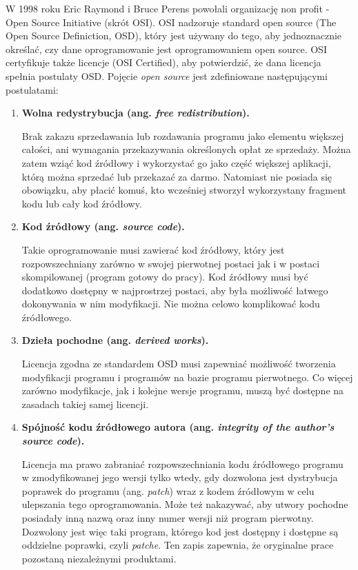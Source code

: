 \documentclass{article}
\begin{document}
W 1998 roku Eric Raymond i Bruce Perens powołali organizację non profit - Open Source Initiative (skrót OSI)\cite{Kotula}. OSI nadzoruje standard open source (The Open Source Definiction, OSD), który jest używany do tego, aby jednoznacznie określać, czy dane oprogramowanie jest oprogramowaniem open source. OSI certyfikuje także licencje (OSI Certified), aby potwierdzić, że dana
licencja spełnia postulaty OSD\cite{opensource.org}. Pojęcie \emph{open source} jest zdefiniowane następującymi postulatami\cite{Kotula}:

\begin{enumerate}
    \item \textbf{Wolna redystrybucja (ang. \emph{free redistribution}).}
    
    \hspace{4mm} Brak zakazu sprzedawania lub rozdawania programu jako elementu większej całości, ani wymagania przekazywania określonych opłat ze sprzedaży. Można zatem wziąć kod źródłowy i wykorzystać go jako część większej aplikacji, którą można sprzedać lub przekazać za darmo. Natomiast nie posiada się obowiązku, aby płacić komuś, kto wcześniej stworzył wykorzystany fragment kodu lub cały kod źródłowy.
    
    \item \textbf{Kod źródłowy (ang. \emph{source code}).}
    
    \hspace{4mm} Takie oprogramowanie musi zawierać kod źródłowy, który jest rozpowszechniany zarówno w swojej pierwotnej postaci jak i w postaci skompilowanej (program gotowy do pracy). Kod źródłowy musi być dodatkowo dostępny w najprostrzej postaci, aby była możliwość łatwego dokonywania w nim modyfikacji. Nie można celowo komplikować kodu źródłowego.
    
    \item \textbf{Dzieła pochodne (ang. \emph{derived works}).}
    
    \hspace{4mm} Licencja zgodna ze standardem OSD musi zapewniać możliwość tworzenia modyfikacji programu i programów na bazie programu pierwotnego. Co więcej zarówno modyfikacje, jak i kolejne wersje programu, muszą być dostępne na zasadach takiej samej licencji. \newpage
    
    \item \textbf{Spójność kodu źródłowego autora (ang. \emph{integrity of the author’s source code}).}
    
    \hspace{4mm} Licencja ma prawo zabraniać rozpowszechniania kodu źródłowego programu w zmodyfikowanej jego wersji tylko wtedy, gdy dozwolona jest dystrybucja poprawek do programu (ang. \emph{patch}) wraz z kodem źródłowym w celu ulepszania tego oprogramowania. Może też nakazywać, aby utwory pochodne posiadały inną nazwą oraz inny numer wersji niż program pierwotny. Dozwolony jest więc taki program, którego kod jest dostępny i dostępne są oddzielne poprawki, czyli \emph{patche}. Ten zapis zapewnia, że oryginalne prace pozostaną niezależnymi produktami.
    

\end{enumerate}
\end{document}

